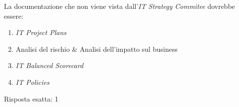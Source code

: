 \begin{Exercise} [
  title={Quiz},
  label={esPG3}
  ]

  \Question La documentazione che non viene vista dall'\textit{IT Strategy 
Commitee} dovrebbe essere:
\begin{enumerate}
 \item \textit{IT Project Plans}
 \item Analisi del rischio \& Analisi dell'impatto sul business
 \item \textit{IT Balanced Scorecard}
 \item \textit{IT Policies}
\end{enumerate}

\end{Exercise}

\begin{Answer} [
  ref={esPG3},
  number={3}
  ]

  \Question Risposta esatta: 1
\end{Answer}
